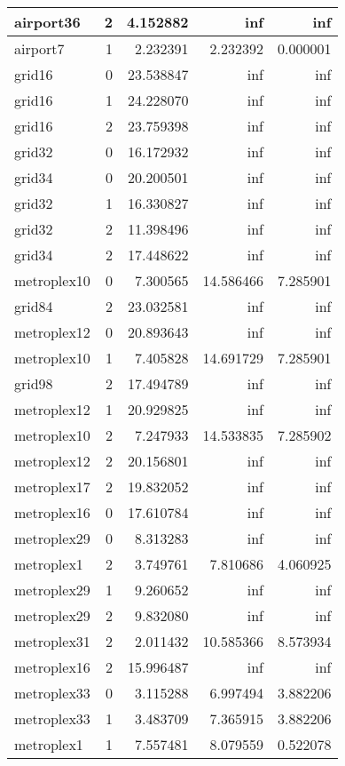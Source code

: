 \begin{longtable}{|l|r|r|r|r|}
\endfoot
\hline
\endlastfoot
airport36 & 2 & 4.152882 & inf & inf \\\hline
airport7 & 1 & 2.232391 & 2.232392 & 0.000001 \\\hline
grid16 & 0 & 23.538847 & inf & inf \\\hline
grid16 & 1 & 24.228070 & inf & inf \\\hline
grid16 & 2 & 23.759398 & inf & inf \\\hline
grid32 & 0 & 16.172932 & inf & inf \\\hline
grid34 & 0 & 20.200501 & inf & inf \\\hline
grid32 & 1 & 16.330827 & inf & inf \\\hline
grid32 & 2 & 11.398496 & inf & inf \\\hline
grid34 & 2 & 17.448622 & inf & inf \\\hline
metroplex10 & 0 & 7.300565 & 14.586466 & 7.285901 \\\hline
grid84 & 2 & 23.032581 & inf & inf \\\hline
metroplex12 & 0 & 20.893643 & inf & inf \\\hline
metroplex10 & 1 & 7.405828 & 14.691729 & 7.285901 \\\hline
grid98 & 2 & 17.494789 & inf & inf \\\hline
metroplex12 & 1 & 20.929825 & inf & inf \\\hline
metroplex10 & 2 & 7.247933 & 14.533835 & 7.285902 \\\hline
metroplex12 & 2 & 20.156801 & inf & inf \\\hline
metroplex17 & 2 & 19.832052 & inf & inf \\\hline
metroplex16 & 0 & 17.610784 & inf & inf \\\hline
metroplex29 & 0 & 8.313283 & inf & inf \\\hline
metroplex1 & 2 & 3.749761 & 7.810686 & 4.060925 \\\hline
metroplex29 & 1 & 9.260652 & inf & inf \\\hline
metroplex29 & 2 & 9.832080 & inf & inf \\\hline
metroplex31 & 2 & 2.011432 & 10.585366 & 8.573934 \\\hline
metroplex16 & 2 & 15.996487 & inf & inf \\\hline
metroplex33 & 0 & 3.115288 & 6.997494 & 3.882206 \\\hline
metroplex33 & 1 & 3.483709 & 7.365915 & 3.882206 \\\hline
metroplex1 & 1 & 7.557481 & 8.079559 & 0.522078 \\\hline

\end{longtable}
